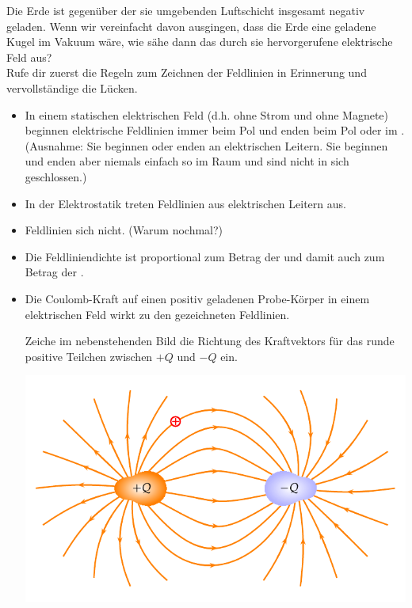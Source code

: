 \documentclass[task=1]{exercise}
\begin{document}
  \task[Feldlinienbild]
  Die Erde ist gegenüber der sie umgebenden Luftschicht insgesamt negativ geladen.
  Wenn wir vereinfacht davon ausgingen, dass die Erde eine geladene Kugel im Vakuum wäre,
  wie sähe dann das durch sie hervorgerufene elektrische Feld aus?\\
  Rufe dir zuerst die Regeln zum Zeichnen der Feldlinien in Erinnerung und vervollständige die Lücken.\\
  \begin{itemize}
   \item In einem statischen elektrischen Feld (d.h. ohne Strom und ohne Magnete) beginnen elektrische Feldlinien immer beim \luecke{3cm} Pol und enden beim \luecke{3cm} Pol oder im \luecke{3cm}. (Ausnahme: Sie beginnen oder enden an elektrischen Leitern. Sie beginnen und enden aber niemals einfach so im Raum und sind nicht in sich geschlossen.)
   \item In der Elektrostatik treten Feldlinien \luecke{3cm} aus elektrischen Leitern aus.
   \item Feldlinien \luecke{3cm} sich nicht. (Warum nochmal?)
   \item Die Feldliniendichte ist proportional zum Betrag der \luecke{3cm} und damit auch zum Betrag der \luecke{5cm}.
   \item Die Coulomb-Kraft auf einen positiv geladenen Probe-Körper in einem elektrischen Feld wirkt \luecke{3cm} zu den gezeichneten Feldlinien.\\
   \begin{minipage}{.4\linewidth}
    Zeiche im nebenstehenden Bild die Richtung des Kraftvektors für das runde positive Teilchen zwischen $+Q$ und $-Q$ ein.
   \end{minipage}
   \hfill
   \begin{minipage}{.5\linewidth}
    \includegraphics[width=\linewidth]{images/chargedParticleInEField.pdf}
   \end{minipage}
  \end{itemize}
\end{document}
